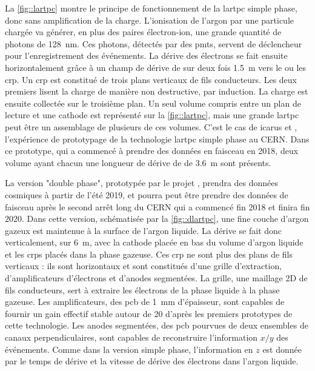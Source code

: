     La \autoref{fig::lartpc} montre le principe de fonctionnement de la \gls{lartpc} simple phase, donc sans amplification de la charge. L'ionisation de l'argon par une particule chargée va générer, en plus des paires électron-ion, une grande quantité de photons de \SI{128}{\nano\meter}. Ces photons, détectés par des \glspl{pmt}, servent de déclencheur pour l'enregistrement des événements. La dérive des électrons se fait ensuite horizontalement grâce à un champ de dérive de \driftfield{} sur deux fois \SI{1.5}{\meter} vers le ou les \gls{crp}. Un \gls{crp} est constitué de trois plans verticaux de fils conducteurs. Les deux premiers lisent la charge de manière non destructive, par induction. La charge est ensuite collectée sur le troisième plan. Un seul volume compris entre un plan de lecture et une cathode est représenté sur la \autoref{fig::lartpc}, mais une grande \gls{lartpc} peut être un assemblage de plusieurs de ces volumes. C'est le cas de \gls{icarus} et \protosp{}, l'expérience de prototypage de la technologie \gls{lartpc} simple phase au CERN. Dans ce prototype, qui a commencé à prendre des données en faisceau en 2018, deux volume ayant chacun une longueur de dérive de de \SI{3.6}{\meter} sont présents.

    La version "double phase", prototypée par le projet \protodp{}, prendra des données cosmiques à partir de l'été 2019, et pourra peut être prendre des données de faisceau après le second arrêt long du CERN qui a commencé fin 2018 et finira fin 2020. Dans cette version, schématisée par la \autoref{fig::dlartpc}, une fine couche d'argon gazeux est maintenue à la surface de l'argon liquide. La dérive se fait donc verticalement, sur \SI{6}{\meter}, avec la cathode placée en bas du volume d'argon liquide et les \glspl{crp} placés dans la phase gazeuse. Ces \gls{crp} ne sont plus des plans de fils verticaux : ils sont horizontaux et sont constitués d'une grille d'extraction, d'amplificateurs d'électrons et d'anodes segmentées. La grille, une maillage 2D de fils conducteurs, sert à extraire les électrons de la phase liquide à la phase gazeuse. Les amplificateurs, des \gls{pcb} de \SI{1}{\milli\meter} d'épaisseur, sont capables de fournir un gain effectif stable autour de 20 d'après les premiers prototypes de cette technologie\cite{Cantini2014}. Les anodes segmentées, des \gls{pcb} pourvues de deux ensembles de canaux perpendiculaires, sont capables de reconstruire l'information $x/y$ des événements. Comme dans la version simple phase, l'information en $z$ est donnée par le temps de dérive et la vitesse de dérive des électrons dans l'argon liquide.

